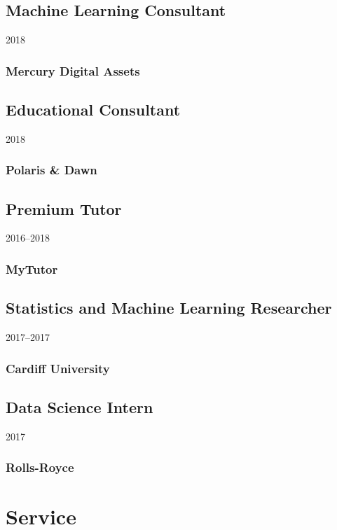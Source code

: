 \documentclass{wgu-cv}
\begin{document}
\subsection{Machine Learning Consultant}
{2018}
\subsubsection{Mercury Digital Assets}
\vspace{-0.20cm}

\subsection{Educational Consultant}
{2018}
\subsubsection{Polaris \& Dawn}
\vspace{-0.20cm}

\subsection{Premium Tutor}
{2016--2018}
\subsubsection{MyTutor}
\vspace{-0.20cm}

\subsection{Statistics and Machine Learning Researcher}
{2017--2017}
\subsubsection{Cardiff University}
\vspace{-0.20cm}

\subsection{Data Science Intern}
{2017}
\subsubsection{Rolls-Royce}

\pagebreak

\section{Service}
\end{document}
